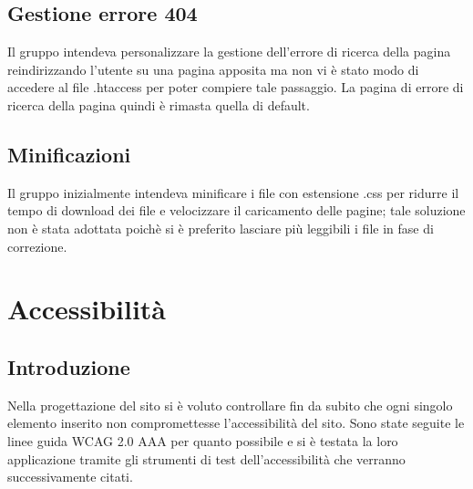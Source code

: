 \documentclass[a4paper,12pt]{article}
\begin{document}
\subsection{Gestione errore 404}
Il gruppo intendeva personalizzare la gestione dell'errore di ricerca della pagina reindirizzando l'utente su una pagina apposita ma non vi è stato modo di accedere al file .htaccess per poter compiere tale passaggio. La pagina di errore di ricerca della pagina quindi è rimasta quella di default.
\subsection{Minificazioni}
Il gruppo inizialmente intendeva minificare i file con estensione .css per ridurre il tempo di download dei file e velocizzare il caricamento delle pagine; tale soluzione non è stata adottata poichè si è preferito lasciare più leggibili i file in fase di correzione.
\section{Accessibilità}
\subsection{Introduzione}
Nella progettazione del sito si è voluto controllare fin da subito che ogni singolo elemento inserito non compromettesse l'accessibilità del sito. Sono state seguite le linee guida WCAG 2.0 AAA per quanto possibile e si è testata la loro applicazione tramite gli strumenti di test dell'accessibilità che verranno successivamente citati.
\end{document}
